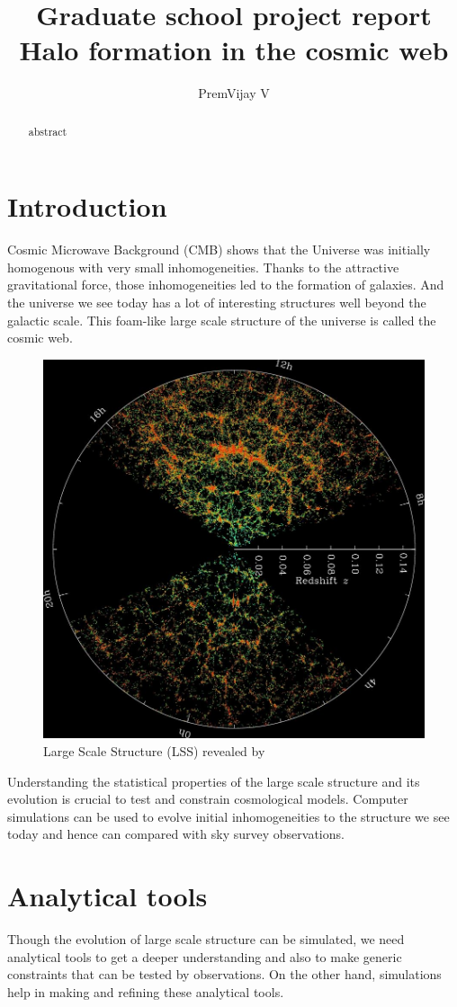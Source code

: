 \documentclass[12pt]{article}
\title{Graduate school project report\\
	Halo formation in the cosmic web}
\author{PremVijay V}
\begin{document}
\maketitle

\begin{abstract}
abstract
\end{abstract}

\section{Introduction}
Cosmic Microwave Background (CMB) shows that the Universe was initially homogenous with very small inhomogeneities. Thanks to the attractive gravitational force, those inhomogeneities led to the formation of galaxies. And the universe we see today has a lot of interesting structures well beyond the galactic scale. This foam-like large scale structure of the universe is called the cosmic web.

\begin{figure}[H]
	\centering
	\includegraphics[width=0.5\linewidth]{orangepie}
	\caption{ Large Scale Structure (LSS) revealed by \cite{cite_sdss}}
	\label{fig:orangepie}
\end{figure}
\noindent
Understanding the statistical properties of the large scale structure and its evolution is crucial to test and constrain cosmological models. Computer simulations can be used to evolve initial inhomogeneities to the structure we see today and hence can compared with sky survey observations.


\section{Analytical tools}
Though the evolution of large scale structure can be simulated, we need analytical tools to get a deeper understanding and also to make generic constraints that can be tested by observations. On the other hand, simulations help in making and refining these analytical tools.\\
\end{document}
